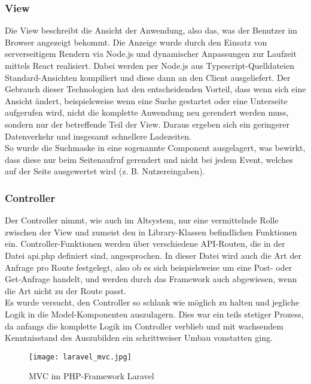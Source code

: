     \subsubsection{View}
        Die View beschreibt die Ansicht der Anwendung, also das, was der Benutzer im Browser angezeigt bekommt. Die Anzeige wurde durch den Einsatz von serverseitigem Rendern via Node.js und dynamischer Anpassungen zur Laufzeit mittels React realisiert. Dabei werden per Node.js aus Typescript-Quelldateien Standard-Ansichten kompiliert und diese dann an den Client ausgeliefert. Der Gebrauch dieser Technologien hat den entscheidenden Vorteil, dass wenn sich eine Ansicht ändert, beispielsweise wenn eine Suche gestartet oder eine Unterseite aufgerufen wird, nicht die komplette Anwendung neu gerendert werden muss, sondern nur der betreffende Teil der View. Daraus ergeben sich ein geringerer Datenverkehr und insgesamt schnellere Ladezeiten.\\
        So wurde die Suchmaske in eine sogenannte \glqq Component\grqq{} ausgelagert, was bewirkt, dass diese nur beim Seitenaufruf gerendert und nicht bei jedem Event, welches auf der Seite ausgewertet wird (z. B. Nutzereingaben).

    \subsubsection{Controller}
        Der Controller nimmt, wie auch im Altsystem, nur eine vermittelnde Rolle zwischen der View und zumeist den in Library-Klassen befindlichen Funktionen ein. Controller-Funktionen werden über verschiedene API-Routen, die in der Datei \glqq api.php \grqq{} definiert sind, angesprochen. In dieser Datei wird auch die Art der Anfrage pro Route festgelegt, also ob es sich beispielsweise um eine Post- oder Get-Anfrage handelt, und werden durch das Framework auch abgewiesen, wenn die Art nicht zu der Route passt.\\
        Es wurde versucht, den Controller so schlank wie möglich zu halten und jegliche Logik in die Model-Komponenten auszulagern. Dies war ein teils stetiger Prozess, da anfangs die komplette Logik im Controller verblieb und mit wachsendem Kenntnisstand des Auszubilden ein schrittweiser Umbau vonstatten ging.

        \vspace{0.5cm}
        \begin{figure}[h]
            \centering
            \texttt{[image: laravel\_mvc.jpg]}
            \caption{MVC im PHP-Framework Laravel}
        \end{figure}

